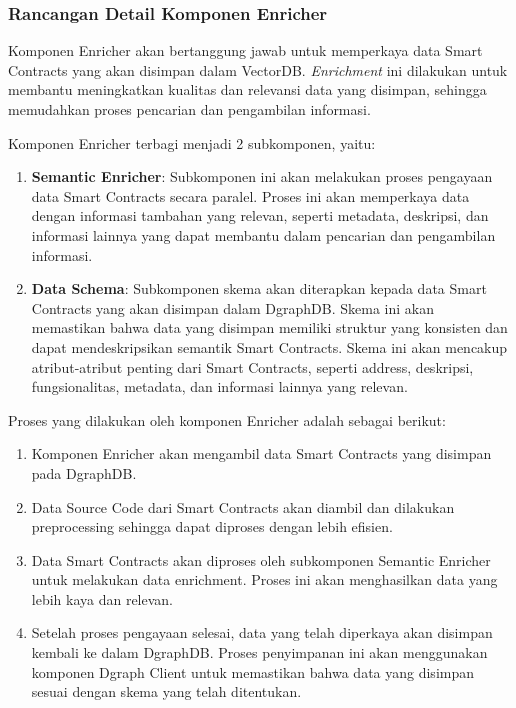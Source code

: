 

\subsubsection{Rancangan Detail Komponen Enricher}

Komponen Enricher akan bertanggung jawab untuk memperkaya data Smart Contracts yang akan disimpan dalam VectorDB. \textit{Enrichment} ini dilakukan untuk membantu meningkatkan kualitas dan relevansi data yang disimpan, sehingga memudahkan proses pencarian dan pengambilan informasi.

Komponen Enricher terbagi menjadi 2 subkomponen, yaitu:
\begin{enumerate}
	\item \textbf{Semantic Enricher}: Subkomponen ini akan melakukan proses pengayaan data Smart Contracts secara paralel. Proses ini akan memperkaya data dengan informasi tambahan yang relevan, seperti metadata, deskripsi, dan informasi lainnya yang dapat membantu dalam pencarian dan pengambilan informasi.
	\item \textbf{Data Schema}:
	      Subkomponen skema akan diterapkan kepada data Smart Contracts yang akan disimpan dalam DgraphDB. Skema ini akan memastikan bahwa data yang disimpan memiliki struktur yang konsisten dan dapat mendeskripsikan semantik Smart Contracts. Skema ini akan mencakup atribut-atribut penting dari Smart Contracts, seperti address, deskripsi, fungsionalitas, metadata, dan informasi lainnya yang relevan.
\end{enumerate}

Proses yang dilakukan oleh komponen Enricher adalah sebagai berikut:
\begin{enumerate}
	\item Komponen Enricher akan mengambil data Smart Contracts yang disimpan pada DgraphDB.
	\item Data Source Code dari Smart Contracts akan diambil dan dilakukan preprocessing sehingga dapat diproses dengan lebih efisien.
	\item Data Smart Contracts akan diproses oleh subkomponen Semantic Enricher untuk melakukan data enrichment. Proses ini akan menghasilkan data yang lebih kaya dan relevan.
	\item Setelah proses pengayaan selesai, data yang telah diperkaya akan disimpan kembali ke dalam DgraphDB. Proses penyimpanan ini akan menggunakan komponen Dgraph Client untuk memastikan bahwa data yang disimpan sesuai dengan skema yang telah ditentukan.
\end{enumerate}

